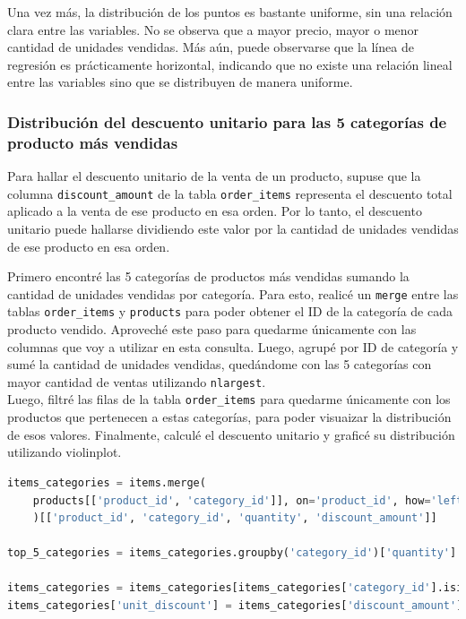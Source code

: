 Una vez más, la distribución de los puntos es bastante uniforme, sin una relación clara entre las variables. No se observa que a mayor precio, mayor o menor cantidad de unidades vendidas. Más aún, puede observarse que la línea de regresión es prácticamente horizontal, indicando que no existe una relación lineal entre las variables sino que se distribuyen de manera uniforme.

\subsubsection{Distribución del descuento unitario para las 5 categorías de producto más vendidas}

Para hallar el descuento unitario de la venta de un producto, supuse que la columna \texttt{discount\_amount} de la tabla \texttt{order\_items} representa el descuento total aplicado a la venta de ese producto en esa orden. Por lo tanto, el descuento unitario puede hallarse dividiendo este valor por la cantidad de unidades vendidas de ese producto en esa orden.

Primero encontré las 5 categorías de productos más vendidas sumando la cantidad de unidades vendidas por categoría. Para esto, realicé un \texttt{merge} entre las tablas \texttt{order\_items} y \texttt{products} para poder obtener el ID de la categoría de cada producto vendido. Aproveché este  paso para quedarme únicamente con las columnas que voy a utilizar en esta consulta. Luego, agrupé por ID de categoría y sumé la cantidad de unidades vendidas, quedándome con las 5 categorías con mayor cantidad de ventas utilizando \texttt{nlargest}. \\
Luego, filtré las filas de la tabla \texttt{order\_items} para quedarme únicamente con los productos que pertenecen a estas categorías, para poder visuaizar la distribución de esos valores. Finalmente, calculé el descuento unitario y graficé su distribución utilizando violinplot.

\begin{lstlisting}[language=Python, xleftmargin=19pt, xrightmargin=19pt]
items_categories = items.merge(
    products[['product_id', 'category_id']], on='product_id', how='left'
    )[['product_id', 'category_id', 'quantity', 'discount_amount']]

top_5_categories = items_categories.groupby('category_id')['quantity'].sum().nlargest(5)

items_categories = items_categories[items_categories['category_id'].isin(top_5_categories.index)]
items_categories['unit_discount'] = items_categories['discount_amount'] / items_categories['quantity']
\end{lstlisting}

